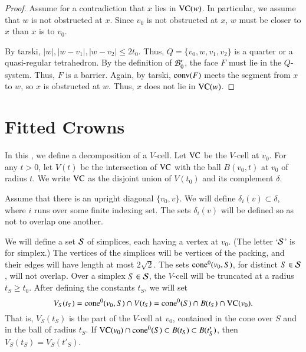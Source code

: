 \begin{proof}
Assume for a contradiction that $x$ lies in ${\operatorname{VC}}(w)$. In
particular, we assume that $w$ is not obstructed at $x$.  Since
$v_0$ is not obstructed at $x$, $w$ must be closer to $x$
than $x$ is to $v_0$.

By tarski, 
   $|w|,|w-v_1|,|w-v_2|\le 2t_0$.  Thus, $Q=\{v_0,w,v_1,v_2\}$ is
a quarter or a quasi-regular tetrahedron.  By the definition of
${\mathcal B}'_0$, the face $F$ must lie in the $Q$-system.  Thus,
$F$ is a barrier.  Again, by tarski,
${\operatorname{conv}}(F)$ meets the segment from $x$ to $w$, so $x$ is obstructed
at $w$.  Thus, $x$ does not lie in ${\operatorname{VC}}(w)$.
\end{proof}





\section{Fitted Crowns}%
    \label{sec:fine-overview}



In this \chap, we define a decomposition of a $V$-cell. Let
${\operatorname{VC}}$ be the $V$-cell at $v_0$.  For any $t > 0$, let
$V(t)$ be the intersection of ${\operatorname{VC}}$ with the ball $B(v_0,t)$ at
$v_0$ of radius $t$. We write ${\operatorname{VC}}$ as the disjoint union
of $V(t_0)$ and its complement $\delta$.

Assume that there is an upright 
diagonal $\{v_0,v\}$. 
We will define $\delta_i(v)\subset\delta$, where $i$ runs
over some finite indexing set.
The sets $\delta_i(v)$ will be defined so as not to overlap
one another. 

We will define a set ${\mathcal S}$ of simplices, each having a vertex at
$v_0$. (The letter `${\mathcal S}$' is for simplex.)
The vertices of the simplices will be vertices of the
packing, and their edges will have length at most $2\sqrt{2}$. The
sets ${\operatorname{cone}}^0(v_0,S)$, for distinct $S\in{\mathcal S}$, will not overlap. Over a
simplex $S\in{\mathcal S}$, the $V$-cell will be truncated at a radius
$t_S\ge t_0$. After defining the constants $t_S$, we will set
    $$V_S(t_S) = {\operatorname{cone}}^0(v_0,S) \cap V(t_S) ={\operatorname{cone}}^0(S)\cap B(t_S)\cap {\operatorname{VC}}(v_0).$$
That is, $V_S(t_S)$ is the part of the $V$-cell at $v_0$,
contained in the cone over $S$ and in the ball of radius $t_S$.
If
    ${\operatorname{VC}}(v_0) \cap {\operatorname{cone}}^0(S)\subset B(t_S)\subset B(t'_S)$,
then
    $V_S(t_S)=V_S(t'_S)$.

